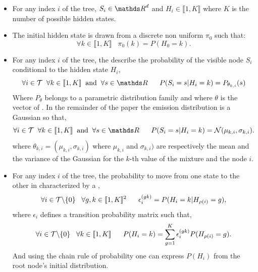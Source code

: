 \documentclass[a4paper,11pt]{report}
\begin{document}
{    \begin{itemize}
      \item For any index $i$ of the tree, $S_{i} \in \dsR^{d}$ and $H_{i} \in \llbracket 1,K \rrbracket$ where $K$ is the number of possible hidden states.
      
      \item The initial hidden state is drawn from a discrete non uniform  $\pi_{0}$ such that:
	  	  \begin{equation}
					\forall k \in \llbracket 1,K \rrbracket \;\;\; \pi_{0}(k) = P(H_{0}=k).
					\label{eq:SCHMT - initial distribution}
				\end{equation}
				
      \item For any index $i$ of the tree, the  describe the probability of the visible node $S_{i}$ conditional to the hidden state $H_{i}$,
				\begin{equation}
				  \forall i \in \mcalT \;\; \forall k \in \llbracket1,K\rrbracket \;\; \text{and} \;\; \forall s \in \dsR
					\;\;\;\;\;\;P(S_{i}=s|H_{i}=k) = P_{\theta_{k,i}}(s)
					\label{eq:SCHMT - Emission distr}
				\end{equation}
				Where $P_{\theta}$ belongs to a parametric distribution family and where $\theta$ is the vector of . In the remainder of the paper the emission distribution is a Gaussian so that,  
      	\begin{equation}
				  \forall i \in \mcalT \;\; \forall k \in \llbracket1,K\rrbracket \;\; \text{and} \;\; \forall s \in \dsR
					\;\;\;\;\;\; P(S_{i}=s | H_{i}=k) = \mcalN(\mu_{k,i},\sigma_{k,i}).
				  \label{eq:SCHMT - Mixt of Gaussian}
				\end{equation}
				where $\theta_{k,i}=(\mu_{k,i},\sigma_{k,i})$ where $\mu_{k,i}$ and $\sigma_{k,i})$ are respectively the mean and the variance of the Gaussian for the $k$-th value of the mixture and the node $i$.
				
			\item For any index $i$ of the tree, the probability to move from one state to the other in characterized by a ,
				\begin{equation}
					\forall i \in \mathcal{T} \backslash \{ 0 \} \;\;\; \forall g,k \in \llbracket1,K\rrbracket^{2}
					\;\;\;\;\;\; \epsilon_{i}^{(gk)} = P(H_{i}= k | H_{\rho(i)}=g), 
					\label{eq:SCHMT - Transition matrix}
				\end{equation}
				where $\epsilon_{i}$ defines a transition probability matrix such that,
				\begin{equation}
				  \forall i \in \mcalT \backslash\{0\} \;\;\;  \forall k \in \llbracket1,K\rrbracket
					\;\;\;\;\;\;  P(H_{i}=k) = \sum_{g=1}^{K} \epsilon_{i}^{(gk)} P(H_{\rho(i)}=g). %
				  \label{eq:SCHMT - State proba 1}
				\end{equation}
				And using the chain rule of probability one can express $P(H_{i})$ from the root node's initial distribution.\\
		\end{itemize}
		
}
\end{document}
